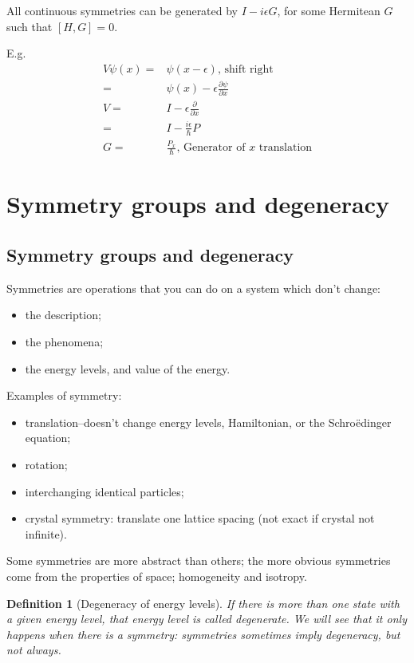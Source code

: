 \documentclass[]{article}
\newtheorem{defn}[thm]{Definition}
\begin{document}
All continuous symmetries can be generated by $I-i \epsilon G$, for some Hermitean $G$ such that $[H,G]=0$.

E.g.
\begin{align*}
	V \psi(x) = & \psi(x-\epsilon)\text{, shift right}\\
	=& \psi(x) - \epsilon \frac{\partial \psi}{\partial x}\\
	V =& I -  \epsilon \frac{\partial }{\partial x}\\
	=& I - \frac{i \epsilon}{\hslash}P\\
	G =& \frac{P_x}{\hslash}\text{, Generator of $x$ translation}
\end{align*}


\section{Symmetry groups and degeneracy}\label{seq:symmetry:degeneracy}

\subsection{Symmetry groups and degeneracy}

Symmetries are operations that you can do on a system which don't change:
\begin{itemize}
	\item the description;
	\item the phenomena;
	\item the energy levels, and value of the energy.
\end{itemize}

Examples of symmetry:
\begin{itemize}
	\item translation--doesn't change energy levels, Hamiltonian, or the Schro\"edinger equation;
	\item rotation;
	\item interchanging identical particles;
	\item crystal symmetry: translate one lattice spacing (not exact if crystal not infinite).
\end{itemize}
Some symmetries are more abstract than others; the more obvious symmetries come from the properties of space; homogeneity and isotropy.

\begin{defn}[Degeneracy of energy levels]
	If there is more than one state with a given energy level, that energy level is called degenerate. We will see that it only happens when there is a symmetry: symmetries sometimes imply degeneracy, but not always.
\end{defn}
\end{document}
